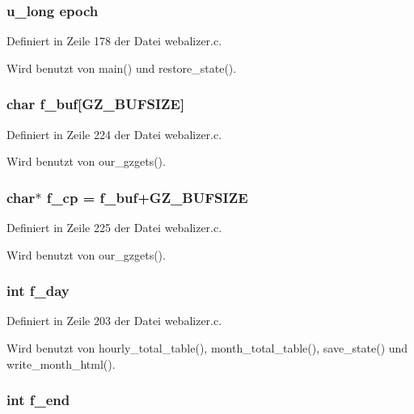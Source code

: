 \subsubsection{\setlength{\rightskip}{0pt plus 5cm}u\_\-long {\bf epoch}}\label{webalizer_8c_71f3fc3b6564ee11c34ff02cee2a3e05}




Definiert in Zeile 178 der Datei webalizer.c.

Wird benutzt von main() und restore\_\-state().
\subsubsection{\setlength{\rightskip}{0pt plus 5cm}char {\bf f\_\-buf}[GZ\_\-BUFSIZE]}\label{webalizer_8c_0f09c2c14de82a844b4cce5c76184709}




Definiert in Zeile 224 der Datei webalizer.c.

Wird benutzt von our\_\-gzgets().
\subsubsection{\setlength{\rightskip}{0pt plus 5cm}char$\ast$ {\bf f\_\-cp} = {\bf f\_\-buf}+GZ\_\-BUFSIZE}\label{webalizer_8c_405a69d1287c4dd254d758f0e2114f60}




Definiert in Zeile 225 der Datei webalizer.c.

Wird benutzt von our\_\-gzgets().
\subsubsection{\setlength{\rightskip}{0pt plus 5cm}int {\bf f\_\-day}}\label{webalizer_8c_4637ce886571ae33e34d7d0ae8d50df8}




Definiert in Zeile 203 der Datei webalizer.c.

Wird benutzt von hourly\_\-total\_\-table(), month\_\-total\_\-table(), save\_\-state() und write\_\-month\_\-html().
\subsubsection{\setlength{\rightskip}{0pt plus 5cm}int {\bf f\_\-end}}\label{webalizer_8c_912061ffd86d7c9c5d45a818091a1809}




